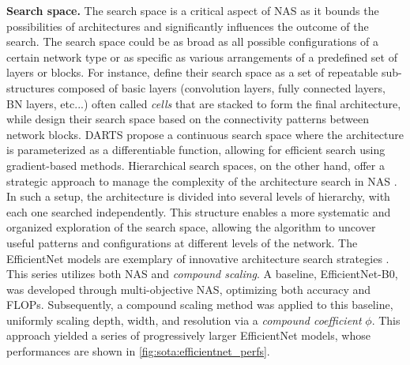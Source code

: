 \noindent\textbf{Search space.} The search space is a critical aspect of \ac{NAS} as it bounds the possibilities
of architectures and significantly influences the outcome of the search. The
search space could be as broad as all possible configurations of a certain
network type or as specific as various arrangements of a predefined set of
layers or blocks. For instance, \cite{DBLP:conf/iclr/ZophL17} define their
search space as a set of repeatable sub-structures composed of basic layers
(convolution layers, fully connected layers, \ac{BN} layers, etc...) often
called \emph{cells} that are stacked to form the final architecture, while
\cite{DBLP:conf/iclr/XieZLL19} design their search space based on the
connectivity patterns between network blocks. DARTS
\cite{DBLP:conf/iclr/LiuSY19} propose a continuous search space where the
architecture is parameterized as a differentiable function, allowing for
efficient search using gradient-based methods. Hierarchical search spaces, on
the other hand, offer a strategic approach to manage the complexity of the
architecture search in \ac{NAS}
\cite{DBLP:conf/cvpr/LiuCSAHY019,DBLP:conf/cvpr/TanCPVSHL19}. In such a setup,
the architecture is divided into several levels of hierarchy, with each one
searched independently. This structure enables a more systematic and organized
exploration of the search space, allowing the algorithm to uncover useful
patterns and configurations at different levels of the network. The EfficientNet
models are exemplary of innovative architecture search strategies
\cite{DBLP:conf/icml/TanL19}. This series utilizes both \ac{NAS} and
\emph{compound scaling}. A baseline, EfficientNet-B0, was developed through
multi-objective \ac{NAS}, optimizing both accuracy and \acp{FLOP}. Subsequently,
a compound scaling method was applied to this baseline, uniformly scaling depth,
width, and resolution via a \emph{compound coefficient} $\phi$. This approach
yielded a series of progressively larger EfficientNet models, whose performances
are shown in \ref{fig:sota:efficientnet_perfs}.\\\


